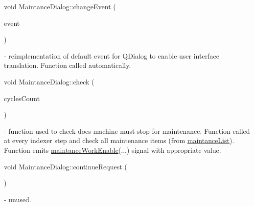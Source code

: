 \mbox{\label{classMaintanceDialog_a2bd5d68e291648614735e3b62fd61bfc}} 
{\footnotesize\ttfamily void Maintance\+Dialog\+::\texorpdfstring{change\+Event}{changeEvent} (\begin{DoxyParamCaption}\item[{Q\+Event $\ast$}]{event }\end{DoxyParamCaption})\hspace{0.3cm}{\ttfamily [protected]}}- reimplementation of default event for Q\+Dialog to enable user interface translation. Function called automatically.

\mbox{\label{classMaintanceDialog_a0eb162bfea71b4712de3cc63cc6bb0f5}} 
{\footnotesize\ttfamily void Maintance\+Dialog\+::\texorpdfstring{check}{check} (\begin{DoxyParamCaption}\item[{int}]{cycles\+Count }\end{DoxyParamCaption})} - function used to check does machine must stop for maintenance. Function called at every indexer step and check all maintenance items (from \hyperlink{classMaintanceDialog_ac4eade50e2d9071c65adf44a2987fab1}{maintance\+List}). Function emits \hyperlink{classMaintanceDialog_ada9e582be087bce2dd96a2629f2a417f}{maintance\+Work\+Enable}(...) signal with appropriate value.

\mbox{\label{classMaintanceDialog_aea9ae7ab9094dfb556fb9ec134b12609}} 
{\footnotesize\ttfamily void Maintance\+Dialog\+::\texorpdfstring{continue\+Request}{continueRequest} (\begin{DoxyParamCaption}{ }\end{DoxyParamCaption})\hspace{0.3cm}{\ttfamily [signal]}} - unused.

